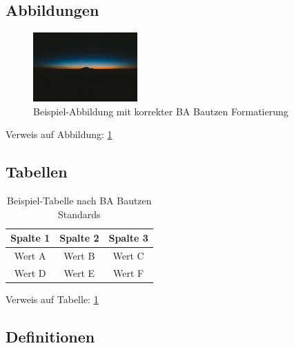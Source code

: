 \documentclass[../main.tex]{subfiles}
\begin{document}


\subsection{Abbildungen}

\begin{figure}[ht]
    \centering
    \includegraphics[width=4cm]{images/picsum lorem.jpg}
    \caption{Beispiel-Abbildung mit korrekter BA Bautzen Formatierung}
    \label{fig:tutorial_image}
\end{figure}

Verweis auf Abbildung: \cref{fig:tutorial_image}

\subsection{Tabellen}

\begin{table}[ht]
    \centering
    \begin{tabular}{|c|c|c|}
        \hline
        \textbf{Spalte 1} & \textbf{Spalte 2} & \textbf{Spalte 3} \\
        \hline
        Wert A & Wert B & Wert C \\
        Wert D & Wert E & Wert F \\
        \hline
    \end{tabular}
    \caption{Beispiel-Tabelle nach BA Bautzen Standards}
    \label{tab:tutorial_table}
\end{table}

Verweis auf Tabelle: \cref{tab:tutorial_table}


\subsection{Definitionen}
\end{document}
